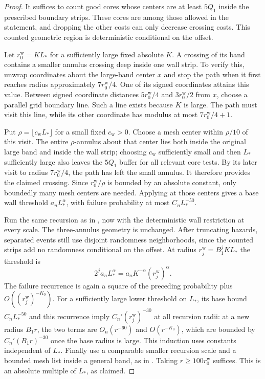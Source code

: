 \begin{proof}
It suffices to count good cores whose centers are at least $5Q_1$
inside the prescribed boundary strips. These cores are among those
allowed in the statement, and dropping the other costs can only
decrease crossing costs. This counted geometric region is deterministic
conditional on the offset.

Let $r_0^{\mathrm w}=K L_*$ for a sufficiently large fixed absolute
$K$. A crossing of its band contains a smaller annulus crossing
deep inside one wall strip. To verify this, unwrap coordinates about
the large-band center $x$ and stop the path when it first reaches
radius approximately $7r_0^{\mathrm w}/4$. One of its signed
coordinates attains this value. Between signed coordinate distances
$5r_0^{\mathrm w}/4$ and $3r_0^{\mathrm w}/2$ from $x$, choose a
parallel grid boundary line. Such a line exists because $K$ is large.
The path must visit this line, while its other coordinate has modulus
at most $7r_0^{\mathrm w}/4+1$.

Put $\rho=\lfloor c_{\mathrm w}L_*\rfloor$ for a small fixed
$c_{\mathrm w}>0$. Choose a mesh center within $\rho/10$ of this
visit. The entire $\rho$-annulus about that center lies both inside
the original large band and inside the wall strip; choosing
$c_{\mathrm w}$ sufficiently small and then $L_*$ sufficiently large
also leaves the $5Q_1$ buffer for all relevant core tests.
By its later visit to radius $7r_0^{\mathrm w}/4$, the path has left
the small annulus. It therefore provides the claimed crossing.
Since $r_0^{\mathrm w}/\rho$ is bounded by an absolute constant,
only boundedly many mesh centers are needed. Applying
 at those centers gives a base wall threshold
$a_nL_*^\alpha$, with failure probability at most $C_nL_*^{-50}$.

Run the same recursion as in , now with
the deterministic wall restriction at every scale. The three-annulus
geometry is unchanged. After truncating hazards, separated events
still use disjoint randomness neighborhoods, since the counted strips
add no randomness conditional on the offset. At radius
$r_j^{\mathrm w}=B_1^jK L_*$ the threshold is
\[
 2^j a_nL_*^\alpha
   =a_nK^{-\alpha}(r_j^{\mathrm w})^\alpha.
\]
The failure recurrence is again a square of the preceding probability
plus $O((r_j^{\mathrm w})^{-K_0})$.
For a sufficiently large lower threshold on $L_*$, its base bound
$C_nL_*^{-50}$ and this recurrence imply
$C_n'(r_j^{\mathrm w})^{-30}$ at all recursion radii: at a new radius
$B_1r$, the two terms are $O_n(r^{-60})$ and $O(r^{-K_0})$, which
are bounded by $C_n'(B_1r)^{-30}$ once the base radius is large.
This induction uses constants independent of $L_*$.
Finally use a comparable smaller recursion scale and a bounded mesh
list inside a general band, as in . Taking
$r\geq100r_0^{\mathrm w}$ suffices. This is an absolute multiple of
$L_*$, as claimed.
\end{proof}

